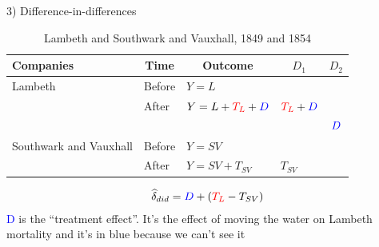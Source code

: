 \documentclass{beamer}
\begin{document}
\begin{frame}{3) Difference-in-differences}

\begin{table}\centering
		\caption{Lambeth and Southwark and Vauxhall, 1849 and 1854}
		\begin{center}
		\begin{tabular}{lll|lc}
		\toprule
		\multicolumn{1}{l}{\textbf{Companies}}&
		\multicolumn{1}{c}{\textbf{Time}}&
		\multicolumn{1}{c}{\textbf{Outcome}}&
		\multicolumn{1}{c}{$D_1$}&
		\multicolumn{1}{c}{$D_2$}\\
		\midrule
		Lambeth & Before & $Y=L$ \\
		& After & $Y=L + \textcolor{red}{T_L} + \textcolor{blue}{D}$ & $\textcolor{red}{T_L}+\textcolor{blue}{D}$\\
		\midrule
		& & & & $\textcolor{blue}{D}$ \\
		\midrule
		Southwark and Vauxhall & Before & $Y=SV$ \\
		& After & $Y=SV + T_{SV}$ & $T_{SV}$\\
		\bottomrule
		\end{tabular}
		\end{center}
	\end{table}

\begin{eqnarray*}
\widehat{\delta}_{did} = \textcolor{blue}{D} + (\textcolor{red}{T_L} - T_{SV})
\end{eqnarray*}\textcolor{blue}{D} is the ``treatment effect''.  It's the effect of moving the water on Lambeth mortality and it's in blue because we can't see it 

\end{frame}
\end{document}
